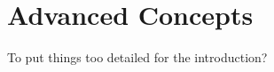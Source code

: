 
\chapter{Advanced Concepts}
\label{cha:concepts}
To put things too detailed for the introduction?

